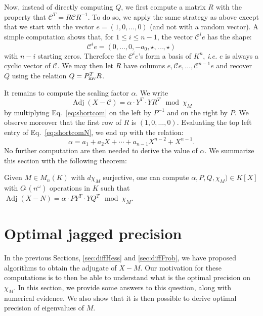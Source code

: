 \documentclass{sig-alternate-05-2015}
\DeclareMathOperator{\adj}{Adj}
\newcommand{\softO}{O\tilde{~}}
\newcommand{\inv}{\text{\rm inv}}
\begin{document}
Now, instead of directly computing $Q$, we first compute a matrix $R$ 
with the property that $\mathscr{C}^T = R \mathscr{C} R^{-1}$. To do so,
we apply the same strategy as above except that we start with the vector
$e = (1, 0, \ldots, 0)$ (and not with a random vector). A simple computation shows
that, for $1 \leq i \leq n{-}1$, the vector $\mathscr{C}^i e$ has the shape:
$$\mathscr{C}^i e = (0, \ldots, 0, -a_0, \star, \ldots, \star)$$
with $n{-}i$ starting zeros. Therefore the $\mathscr{C}^i e$'s form a basis of
$K^n$, \emph{i.e.} $e$ is always a cyclic vector of $\mathscr{C}$.
We may then let $R$ have columns $e, \mathscr{C}e, \dots, \mathscr{C}^{n-1}e$
and recover $Q$ using the relation $Q = P_\inv^T R$.

It remains to compute the scaling factor $\alpha$. We write
\begin{equation}
\label{eq:shortcomN}
\adj(X{-}\mathscr{C}) = \alpha \cdot Y^T \cdot Y R^T \mod \chi_M
\end{equation}
by multiplying Eq.~\eqref{eq:shortcom} on the 
left by $P^{-1}$ and on the right by $P$. We observe
moreover that the first row of $R$ is $(1, 0, \ldots, 0)$. Evaluating
the top left entry of Eq.~\eqref{eq:shortcomN}, we end up with the 
relation:
$$\alpha = a_1 + a_2 X + \cdots + a_{n-1} X^{n-2} + X^{n-1}.$$
No further computation are then needed to derive the value of $\alpha$.
We summarize this section with the following theorem:

\begin{theo}
\label{thm:compute_shortcom}
Given $M \in M_n(K)$ with $d \chi_M$ surjective,
one can compute $\alpha, P, Q, \chi_M) \in K[X]$ with
$\softO(n^\omega)$ operations in $K$ such that
$\adj(X{-}N) = \alpha \cdot P Y^T \cdot Y Q^T \mod \chi_M$.
\end{theo}

\section{Optimal jagged precision}
\label{sec:optjagged}

In the previous Sections, \ref{sec:diffHess} and \ref{sec:diffFrob},
we have proposed algorithms to obtain the adjugate of 
$X-M.$ Our motivation for these computations is to then
be able to understand what is the optimal precision on $\chi_M.$
In this section, we provide some answers to this question,
along with numerical evidence.
We also show that it is then possible to derive 
optimal precision of eigenvalues of $M.$ 
\end{document}
